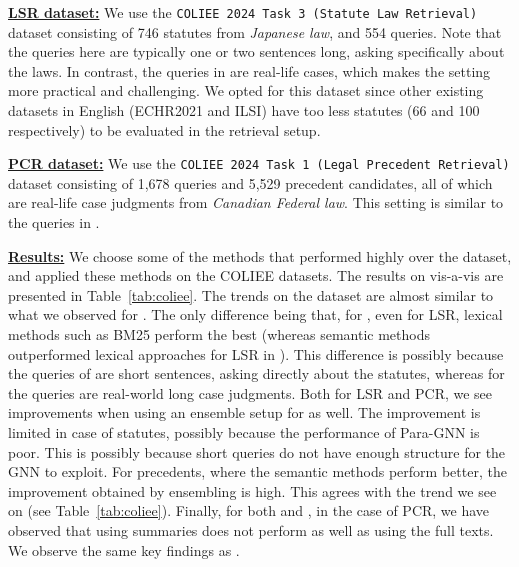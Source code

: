 \noindent\underline{\textbf{LSR dataset:}} We use the \texttt{COLIEE 2024 Task 3 (Statute Law Retrieval)} dataset consisting of 746 statutes from \textit{Japanese law}, and 554 queries. Note that the queries here are typically one or two sentences long, asking specifically about the laws. 
In contrast, the queries in \ilpcsr{} are real-life cases, which makes the setting more practical and challenging. 
We opted for this dataset since other existing datasets in English (ECHR2021 and ILSI) have too less statutes  (66 and 100 respectively) to be evaluated in the retrieval setup. 

\noindent \underline{\textbf{PCR dataset:}} We use the \texttt{COLIEE 2024 Task 1 (Legal Precedent Retrieval)} dataset consisting of 1,678 queries and 5,529 precedent candidates, all of which are real-life case judgments from \textit{Canadian Federal law}. This setting is similar to the queries in \ilpcsr{}. 

\noindent \underline{\textbf{Results:}}
We choose some of the methods that performed highly over the \ilpcsr{} dataset, and applied these methods on the COLIEE datasets.
The results on \coliee{} vis-a-vis \ilpcsr{} are presented in Table~\ref{tab:coliee}.
The trends on the \coliee{} dataset are almost similar to what we observed for \ilpcsr{}. 
The only difference being that, for \coliee{}, even for LSR, lexical methods such as BM25 perform the best (whereas semantic methods outperformed lexical approaches for LSR in \ilpcsr{}). 
This difference is possibly because the queries of \coliee{} are short sentences, asking directly about the statutes, whereas for \ilpcsr{} the queries are real-world long case judgments. Both for LSR and PCR, we see improvements when using an ensemble setup for \coliee{} as well. The improvement is limited in case of statutes, possibly because the performance of Para-GNN is poor. This is possibly because short queries do not have enough structure for the GNN to exploit. For precedents, where the semantic methods perform better, the improvement obtained by ensembling is high. 
This agrees with the trend we see on \ilpcsr{} (see Table~\ref{tab:coliee}). Finally, for both \ilpcsr{} and \coliee{}, in the case of PCR, we have observed that using summaries does not perform as well as using the full texts. We observe the same key findings as \ilpcsr. 

